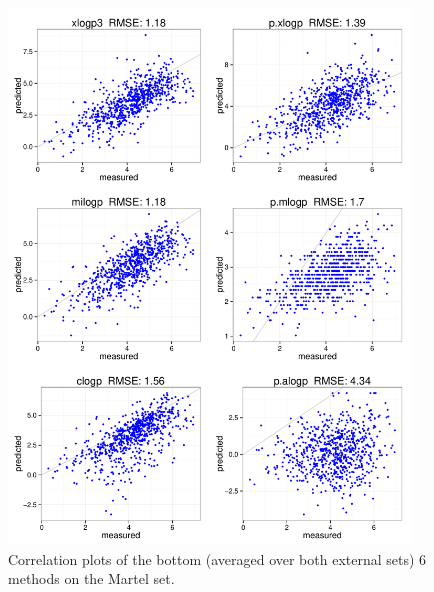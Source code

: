 \documentclass[]{article}
\begin{document}
\begin{figure}[ht]
  \centering
  \includegraphics[width=0.95\textwidth]{./figures_si/martel_scatter_2.pdf}
  \caption{Correlation plots of the bottom (averaged over both external sets) 6 methods on the Martel set.}
  \label{fig:external_comparison2}
\end{figure}
\end{document}
